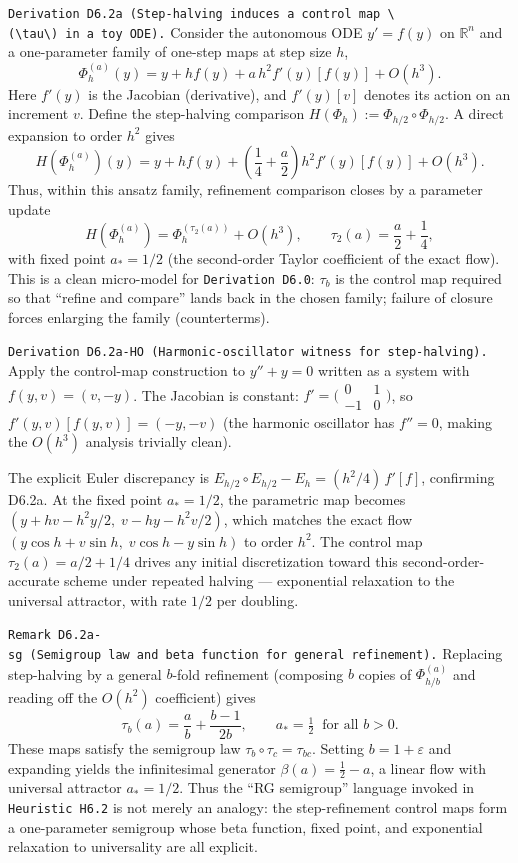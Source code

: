 \documentclass[
]{article}
\begin{document}
\texttt{Derivation\ D6.2a\ (Step-halving\ induces\ a\ control\ map\ \textbackslash{}(\textbackslash{}tau\textbackslash{})\ in\ a\ toy\ ODE).}
Consider the autonomous ODE \(y'=f(y)\) on \(\mathbb R^n\) and a
one-parameter family of one-step maps at step size \(h\), \[
\Phi_h^{(a)}(y)=y+h f(y)+a\,h^2 f'(y)[f(y)]+O(h^3).
\] Here \(f'(y)\) is the Jacobian (derivative), and \(f'(y)[v]\) denotes
its action on an increment \(v\). Define the step-halving comparison
\(H(\Phi_h):=\Phi_{h/2}\circ \Phi_{h/2}\). A direct expansion to order
\(h^2\) gives \[
H(\Phi_h^{(a)})(y)=y+h f(y)+\left(\frac14+\frac{a}{2}\right)h^2 f'(y)[f(y)]+O(h^3).
\] Thus, within this ansatz family, refinement comparison closes by a
parameter update \[
H(\Phi_h^{(a)})=\Phi_h^{(\tau_2(a))}+O(h^3),\qquad \tau_2(a)=\frac{a}{2}+\frac14,
\] with fixed point \(a_\ast=1/2\) (the second-order Taylor coefficient
of the exact flow). This is a clean micro-model for
\texttt{Derivation\ D6.0}: \(\tau_b\) is the control map required so
that ``refine and compare'' lands back in the chosen family; failure of
closure forces enlarging the family (counterterms).

\texttt{Derivation\ D6.2a-HO\ (Harmonic-oscillator\ witness\ for\ step-halving).}
Apply the control-map construction to \(y'' + y = 0\) written as a
system with \(f(y,v) = (v,-y)\). The Jacobian is constant:
\(f'= \bigl(\begin{smallmatrix}0&1\\-1&0\end{smallmatrix}\bigr)\), so
\(f'(y,v)[f(y,v)] = (-y,-v)\) (the harmonic oscillator has \(f''=0\),
making the \(O(h^3)\) analysis trivially clean).

The explicit Euler discrepancy is
\(E_{h/2}\circ E_{h/2} - E_h = (h^2/4)\,f'[f]\), confirming D6.2a. At
the fixed point \(a_\ast = 1/2\), the parametric map becomes
\((y + hv - h^2 y/2,\; v - hy - h^2 v/2)\), which matches the exact flow
\((y\cos h + v\sin h,\; v\cos h - y\sin h)\) to order \(h^2\). The
control map \(\tau_2(a) = a/2 + 1/4\) drives any initial discretization
toward this second-order-accurate scheme under repeated halving ---
exponential relaxation to the universal attractor, with rate \(1/2\) per
doubling.

\texttt{Remark\ D6.2a-sg\ (Semigroup\ law\ and\ beta\ function\ for\ general\ refinement).}
Replacing step-halving by a general \(b\)-fold refinement (composing
\(b\) copies of \(\Phi_{h/b}^{(a)}\) and reading off the \(O(h^2)\)
coefficient) gives \[
\tau_b(a)=\frac{a}{b}+\frac{b-1}{2b},\qquad a_\ast=\tfrac12\;\;\text{for all }b>0.
\] These maps satisfy the semigroup law \(\tau_b\circ\tau_c=\tau_{bc}\).
Setting \(b=1+\varepsilon\) and expanding yields the infinitesimal
generator \(\beta(a)=\tfrac12-a\), a linear flow with universal
attractor \(a_\ast=1/2\). Thus the ``RG semigroup'' language invoked in
\texttt{Heuristic\ H6.2} is not merely an analogy: the step-refinement
control maps form a one-parameter semigroup whose beta function, fixed
point, and exponential relaxation to universality are all explicit.
\end{document}
